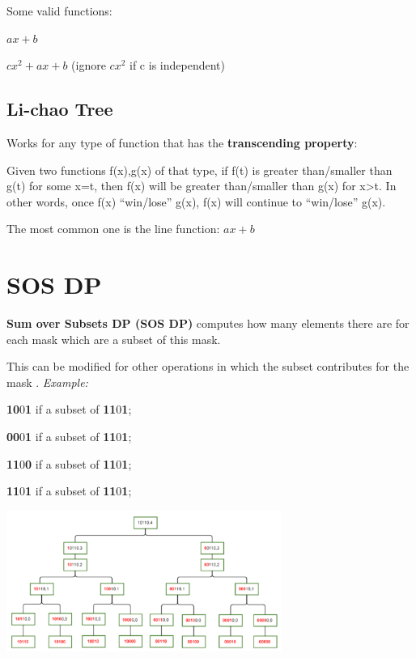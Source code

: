     Some valid functions:

    $ax + b$
    
    $cx^2 + ax + b$ 
    (ignore $cx^2$ if c is independent)


\subsection{Li-chao Tree}

    Works for any type of function that has the \textbf{transcending property}:

    Given two functions f(x),g(x) of that type, 
    if f(t) is greater than/smaller than g(t) for some x=t,
    then f(x) will be greater than/smaller than g(x) for x>t.
    In other words, once f(x) “win/lose” g(x), f(x) will continue to “win/lose” g(x).

    The most common one is the line function: $ ax + b $

\section{SOS DP}

    \textbf{Sum over Subsets DP (SOS DP)} computes how many elements there are for each mask
    which are a subset of this mask.

    This can be modified for other operations in which the subset contributes for the mask
    .
    \textit{Example:}

    \textbf{10}0\textbf{1} if a subset of \textbf{11}0\textbf{1};

    \textbf{00}0\textbf{1} if a subset of \textbf{11}0\textbf{1};
    
    \textbf{11}0\textbf{0} if a subset of \textbf{11}0\textbf{1};
    
    \textbf{11}0\textbf{1} if a subset of \textbf{11}0\textbf{1};

    \begin{center}
        \includegraphics[width=9cm]{content/dynamic-programming/sos-example.pdf}
    \end{center}

